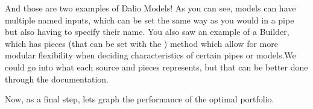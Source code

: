 \documentclass[letterpaper,10pt,english]{sphinxmanual}
\begin{document}
\begin{sphinxVerbatim}[commandchars=\\\{\}]
   \PYGZbs{}
     \PYGZbs{}
     \PYGZbs{}

  \PYGZbs{}
      

  \PYGZbs{}
     \PYGZbs{}
     
\end{sphinxVerbatim}

And those are two examples of Dal\sphinxhyphen{}io Models! As you can see, models can have multiple named inputs, which can be set the same way as you would in a pipe but also having to specify their name. You also saw an example of a Builder, which has pieces (that can be set with the ) method which allow for more modular flexibility when deciding characteristics of certain pipes or models.We could go into what each source and pieces represents, but that can be better done through the documentation.

Now, as a final step, lets graph the performance of the optimal portfolio.
\end{document}
